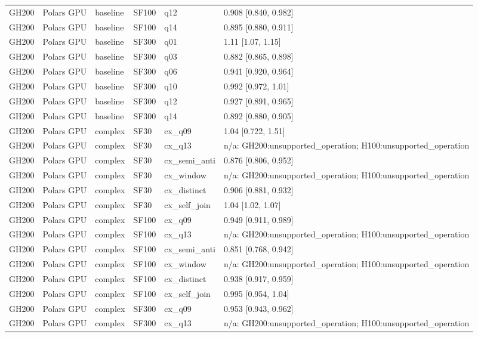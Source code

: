 \begin{longtable}{llllll}
GH200 & Polars GPU & baseline & SF100 & q12 & 0.908 [0.840, 0.982] \\
GH200 & Polars GPU & baseline & SF100 & q14 & 0.895 [0.880, 0.911] \\
GH200 & Polars GPU & baseline & SF300 & q01 & 1.11 [1.07, 1.15] \\
GH200 & Polars GPU & baseline & SF300 & q03 & 0.882 [0.865, 0.898] \\
GH200 & Polars GPU & baseline & SF300 & q06 & 0.941 [0.920, 0.964] \\
GH200 & Polars GPU & baseline & SF300 & q10 & 0.992 [0.972, 1.01] \\
GH200 & Polars GPU & baseline & SF300 & q12 & 0.927 [0.891, 0.965] \\
GH200 & Polars GPU & baseline & SF300 & q14 & 0.892 [0.880, 0.905] \\
GH200 & Polars GPU & complex & SF30 & cx\_q09 & 1.04 [0.722, 1.51] \\
GH200 & Polars GPU & complex & SF30 & cx\_q13 & n/a: GH200:unsupported\_operation; H100:unsupported\_operation \\
GH200 & Polars GPU & complex & SF30 & cx\_semi\_anti & 0.876 [0.806, 0.952] \\
GH200 & Polars GPU & complex & SF30 & cx\_window & n/a: GH200:unsupported\_operation; H100:unsupported\_operation \\
GH200 & Polars GPU & complex & SF30 & cx\_distinct & 0.906 [0.881, 0.932] \\
GH200 & Polars GPU & complex & SF30 & cx\_self\_join & 1.04 [1.02, 1.07] \\
GH200 & Polars GPU & complex & SF100 & cx\_q09 & 0.949 [0.911, 0.989] \\
GH200 & Polars GPU & complex & SF100 & cx\_q13 & n/a: GH200:unsupported\_operation; H100:unsupported\_operation \\
GH200 & Polars GPU & complex & SF100 & cx\_semi\_anti & 0.851 [0.768, 0.942] \\
GH200 & Polars GPU & complex & SF100 & cx\_window & n/a: GH200:unsupported\_operation; H100:unsupported\_operation \\
GH200 & Polars GPU & complex & SF100 & cx\_distinct & 0.938 [0.917, 0.959] \\
GH200 & Polars GPU & complex & SF100 & cx\_self\_join & 0.995 [0.954, 1.04] \\
GH200 & Polars GPU & complex & SF300 & cx\_q09 & 0.953 [0.943, 0.962] \\
GH200 & Polars GPU & complex & SF300 & cx\_q13 & n/a: GH200:unsupported\_operation; H100:unsupported\_operation \\

\end{longtable}
